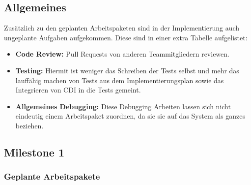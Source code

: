 \begin{landscape}
	
	\subsection{Allgemeines}
	
	Zusätzlich zu den geplanten Arbeitspaketen sind in der Implementierung auch ungeplante Aufgaben aufgekommen. Diese sind in einer extra Tabelle aufgelistet:
	\begin{itemize}
		\item \textbf{Code Review:} Pull Requests von anderen Teammitgliedern reviewen.
		\item \textbf{Testing:} Hiermit ist weniger das Schreiben der Tests selbst und mehr das lauffähig machen von Tests aus dem Implementierungsplan sowie das Integrieren von CDI in die Tests gemeint.
		\item \textbf{Allgemeines Debugging:} Diese Debugging Arbeiten lassen sich nicht eindeutig einem Arbeitspaket zuordnen, da sie sie auf das System als ganzes beziehen.
	\end{itemize}

	\subsection{Milestone 1}
	\subsubsection{Geplante Arbeitspakete}
\end{landscape}

